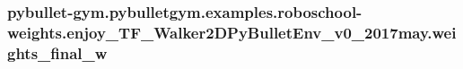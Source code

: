 \subsubsection[{\texorpdfstring{weights\+\_\+final\+\_\+w}{weights_final_w}}]{\setlength{\rightskip}{0pt plus 5cm}pybullet-\/gym.\+pybulletgym.\+examples.\+roboschool-\/weights.\+enjoy\+\_\+\+T\+F\+\_\+\+Walker2\+D\+Py\+Bullet\+Env\+\_\+v0\+\_\+2017may.\+weights\+\_\+final\+\_\+w}\hypertarget{namespacepybullet-gym_1_1pybulletgym_1_1examples_1_1roboschool-weights_1_1enjoy___t_f___walker2_d_py_bullet_env__v0__2017may_a9f7621dbc858c6ed1a32a51d4d979f50}{}\label{namespacepybullet-gym_1_1pybulletgym_1_1examples_1_1roboschool-weights_1_1enjoy___t_f___walker2_d_py_bullet_env__v0__2017may_a9f7621dbc858c6ed1a32a51d4d979f50}
